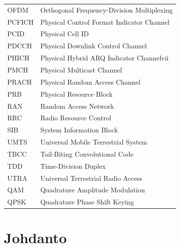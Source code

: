\documentclass[finnish,12pt,a4paper,pdftex]{article}
\begin{document}
\begin{tabular}{ll}
OFDM & Orthogonal Frequency-Division Multiplexing \\
PCFICH & Physical Control Format Indicator Channel \\
PCID & Physical Cell ID \\
PDCCH & Physical Downlink Control Channel \\
PHICH & Physical Hybrid ARQ Indicator Channelvii \\
PMCH & Physical Multicast Channel \\
PRACH & Physical Random Access Channel \\
PRB & Physical Resource Block \\
RAN & Random Access Network \\
RRC & Radio Resource Control \\
SIB & System Information Block \\
UMTS & Universal Mobile Terrestrial System \\
TBCC & Tail-Biting Convolutional Code \\
TDD & Time-Division Duplex \\
UTRA & Universal Terrestrial Radio Access \\
QAM & Quadrature Amplitude Modulation \\
QPSK & Quadrature Phase Shift Keying \\
\end{tabular}


\cleardoublepage{}
\storeinipagenumber{}
\setcounter{page}{1}


\section{Johdanto}
\end{document}
